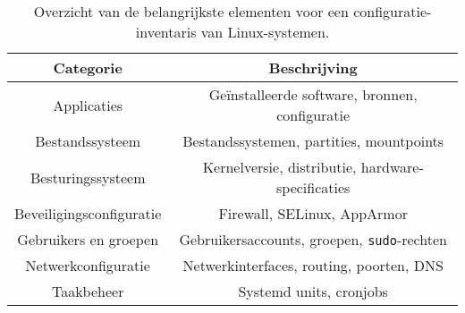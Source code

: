 \begin{table}[!h]
    \begin{center}
        \begin{tabular}{ c c }
            \hline
                Categorie & Beschrijving \\ [0.5ex] 
            \hline
                Applicaties              & Ge\"installeerde software, bronnen, configuratie \\
                Bestandssysteem          & Bestandssystemen, partities, mountpoints \\
                Besturingssysteem        & Kernelversie, distributie, hardware-specificaties \\
                Beveiligingsconfiguratie & Firewall, SELinux, AppArmor \\
                Gebruikers en groepen    & Gebruikersaccounts, groepen, \texttt{sudo}-rechten \\
                Netwerkconfiguratie      & Netwerkinterfaces, routing, poorten, DNS \\
                Taakbeheer               & Systemd units, cronjobs \\
        \end{tabular}
    \end{center}
    \caption[Belangrijke elementen configuratie-inventaris.]{Overzicht van de belangrijkste elementen voor een configuratie-inventaris van Linux-systemen.}
    \label{table:risico_conclusie}
\end{table}
